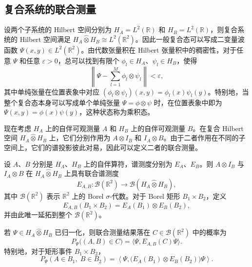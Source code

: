 \documentclass[UTF8,a4paper,11pt,openany]{ctexbook}
\begin{document}
\subsection{复合系统的联合测量}

设两个子系统的 Hilbert 空间分别为 $H_A=L^2(\mathbb R)$ 和 $H_B=L^2(\mathbb R)$，则复合系统的 Hilbert 空间满足 $H_A\widehat{\otimes}H_B\cong L^2(\mathbb R^2)$。因此一般复合态可以写成二变量波函数 $\Psi(x,y)\in L^2(\mathbb R^2)$。由代数张量积在 Hilbert 张量积中的稠密性，对于任意 $\Psi$ 和任意 $\varepsilon>0$，总可以找到有限个 $\phi_l\in H_A$、$\psi_l\in H_B$，使得
\begin{equation}
    \left\|
        \Psi-
        \sum_{l=1}^{M}\phi_l\otimes\psi_l
    \right\|
    <\varepsilon,
\end{equation}
其中单纯张量在位置表象中对应 $(\phi_l\otimes\psi_l)(x,y)=\phi_l(x)\psi_l(y)$。特别地，当整个复合态本身可以写成单个单纯张量 $\Psi=\phi\otimes\psi$ 时，在位置表象中即为 $\Psi(x,y)=\phi(x)\psi(y)$，这种状态称为乘积态。

现在考虑 $H_A$ 上的自伴可观测量 $A$ 和 $H_B$ 上的自伴可观测量 $B$。在复合 Hilbert 空间 $H_A\widehat{\otimes}H_B$ 上，它们分别作用为 $A\otimes I_B$ 和 $I_A\otimes B$。由于二者作用在不同的子空间上，它们的谱投影彼此对易，因此可以定义二者的联合测量。

\begin{definition}[复合系统的联合谱测度]
设 $A$、$B$ 分别是 $H_A$、$H_B$ 上的自伴算符，谱测度分别为 $E_A$、$E_B$。则 $A\otimes I_B$ 与 $I_A\otimes B$ 在 $H_A\widehat{\otimes}H_B$ 上具有联合谱测度
\[
E_{A,B}:\mathcal B(\mathbb R^2)
\longrightarrow
\mathcal B(H_A\widehat{\otimes}H_B),
\]
其中 $\mathcal B(\mathbb R^2)$ 表示 $\mathbb R^2$ 上的 Borel $\sigma$-代数。对于 Borel 矩形 $B_1\times B_2$，定义
\begin{equation}
    E_{A,B}(B_1\times B_2)
    =
    E_A(B_1)\otimes E_B(B_2),
\end{equation}
并由此唯一延拓到整个 $\mathcal B(\mathbb R^2)$。

若 $\Psi\in H_A\widehat{\otimes}H_B$ 已归一化，则联合测量结果落在
$C\in\mathcal B(\mathbb R^2)$ 中的概率为
\begin{equation}
    P_\Psi\bigl((A,B)\in C\bigr)
    =
    \langle\Psi,E_{A,B}(C)\Psi\rangle.
\end{equation}
特别地，对于矩形事件 $B_1\times B_2$，
\begin{equation}
    P_\Psi(A\in B_1,\;B\in B_2)
    =
    \left\langle
        \Psi,
        \bigl(E_A(B_1)\otimes E_B(B_2)\bigr)\Psi
    \right\rangle.
\end{equation}
\end{definition}
\end{document}
